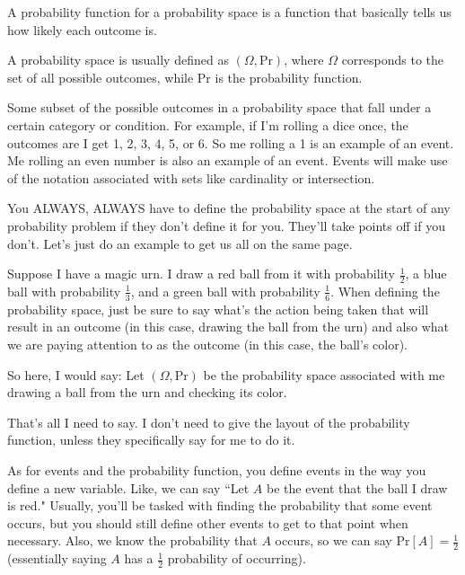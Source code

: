 \documentclass[11pt]{scrartcl}
\begin{document}
\begin{definition}
    A probability function for a probability space is a function that basically tells us how likely each outcome is.
\end{definition}

A probability space is usually defined as $(\Omega, \text{Pr})$, where $\Omega$ corresponds to the set of all possible outcomes, while Pr is the probability function.

\begin{definition}[Event]
    Some subset of the possible outcomes in a probability space that fall under a certain category or condition. For example, if I'm rolling a dice once, the outcomes are I get 1, 2, 3, 4, 5, or 6. So me rolling a 1 is an example of an event. Me rolling an even number is also an example of an event. Events will make use of the notation associated with sets like cardinality or intersection.
\end{definition}

\begin{caveat}
    You ALWAYS, ALWAYS have to define the probability space at the start of any probability problem if they don't define it for you. They'll take points off if you don't. Let's just do an example to get us all on the same page.
\end{caveat}

Suppose I have a magic urn. I draw a red ball from it with probability $\frac{1}{2}$, a blue ball with probability $\frac{1}{3}$, and a green ball with probability $\frac{1}{6}$. When defining the probability space, just be sure to say what's the action being taken that will result in an outcome (in this case, drawing the ball from the urn) and also what we are paying attention to as the outcome (in this case, the ball's color).

So here, I would say: Let $(\Omega, \text{Pr})$ be the probability space associated with me drawing a ball from the urn and checking its color.

That's all I need to say. I don't need to give the layout of the probability function, unless they specifically say for me to do it.

As for events and the probability function, you define events in the way you define a new variable. Like, we can say ``Let $A$ be the event that the ball I draw is red." Usually, you'll be tasked with finding the probability that some event occurs, but you should still define other events to get to that point when necessary. Also, we know the probability that $A$ occurs, so we can say $\text{Pr}[A] = \frac{1}{2}$ (essentially saying $A$ has a $\frac{1}{2}$ probability of occurring).
\end{document}
